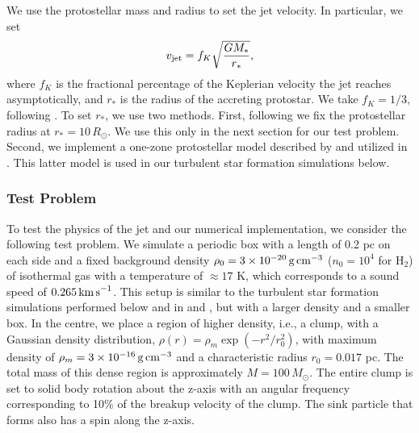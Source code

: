 \documentclass[../dissertation.tex]{subfiles}
\begin{document}
We use the protostellar mass and radius to set the jet velocity.
In particular, we set
\begin{equation}\label{eq:jet_vjet}
v_{\rm jet} = f_{K} \sqrt{\frac{GM_*}{r_*}},
\end{equation}
where $f_{K}$ is the fractional percentage of the Keplerian velocity the jet reaches asymptotically, and $r_*$ is the radius of the accreting protostar.
We take $f_{K} = 1/3$, following \citet{2014MNRAS.439.3420M}.
To set $r_*$, we use two methods.
First, following \citet{2014ApJ...790..128F} we fix the protostellar radius at $r_* = 10\,R_{\odot}$.
We use this only in the next section for our test problem.
Second, we implement a one-zone protostellar model described by \citet[][hereafter known as O09]{2009ApJ...703..131O} and utilized in \citet{2014MNRAS.439.3420M}.
This latter model is used in our turbulent star formation simulations below.

\subsubsection{Test Problem}

To test the physics of the jet and our numerical implementation, we consider the following test problem.
We simulate a periodic box with a length of 0.2 pc on each side and a fixed background density $\rho_0 = 3\times 10^{-20}\,{\rm g\,cm^{-3}}$ ($n_0 = 10^4$ for H$_2$) of isothermal gas with a temperature of $\approx 17$ K, which corresponds to a sound speed of $0.265\,{\rm km\,s}^{-1}$.
This setup is similar to the turbulent star formation simulations performed below and in \citet{2015ApJ...800...49L} and \citet{2017MNRAS.465.1316M}, but with a larger density and a smaller box.
In the centre, we place a region of higher density, i.e., a clump, with a Gaussian density distribution, $\rho(r) = \rho_m\exp(-r^2/r_0^2)$,  with maximum density of $\rho_m=3\times 10^{-16}\,{\rm g\,cm^{-3}}$ and a characteristic radius $r_0=0.017$ pc.
The total mass of this dense region is approximately $M = 100\,M_{\odot}$.
The entire clump is set to solid body rotation about the z-axis with an angular frequency corresponding to 10\% of the breakup velocity of the clump.
The sink particle that forms also has a spin along the z-axis.
\end{document}
